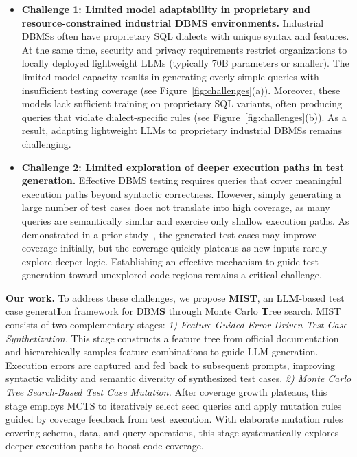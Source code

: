 \begin{itemize}[leftmargin=*]

\item  \textbf{Challenge 1: Limited model adaptability in proprietary and resource-constrained industrial DBMS environments.} 
Industrial DBMSs often have proprietary SQL dialects with unique syntax and features. At the same time, security and privacy requirements restrict organizations to locally deployed lightweight LLMs (typically 70B parameters or smaller). The limited model capacity results in generating overly simple queries with insufficient testing coverage (see Figure~\ref{fig:challenges}(a)). Moreover, these models lack sufficient training on proprietary SQL variants, often producing queries that violate dialect-specific rules (see Figure~\ref{fig:challenges}(b)). As a result, adapting lightweight LLMs to proprietary industrial DBMSs remains challenging.

\item \textbf{Challenge 2: Limited exploration of deeper execution paths in test generation.}
Effective DBMS testing requires queries that cover meaningful execution paths beyond syntactic correctness. However, simply generating a large number of test cases does not translate into high coverage, as many queries are semantically similar and exercise only shallow execution paths. As demonstrated in a prior study~\cite{wang2021industry}, the generated test cases may improve coverage initially, but the coverage quickly plateaus as new inputs rarely explore deeper logic. Establishing an effective mechanism to guide test generation toward unexplored code regions remains a critical challenge.

\end{itemize}



\noindent \textbf{Our work.} To address these challenges, we propose \textbf{MIST}, an LL\textbf{M}-based test case generat\textbf{I}on framework for DBM\textbf{S} through Monte Carlo \textbf{T}ree search. MIST consists of two complementary stages: \textit{1) Feature-Guided Error-Driven Test Case Synthetization.} This stage constructs a feature tree from official documentation and hierarchically samples feature combinations to guide LLM generation. Execution errors are captured and fed back to subsequent prompts, improving syntactic validity and semantic diversity of synthesized test cases. \textit{2) Monte Carlo Tree Search-Based Test Case Mutation.} After coverage growth plateaus, this stage employs MCTS to iteratively select seed queries and apply mutation rules guided by coverage feedback from test execution. With elaborate mutation rules covering schema, data, and query operations, this stage systematically explores deeper execution paths to boost code coverage.

